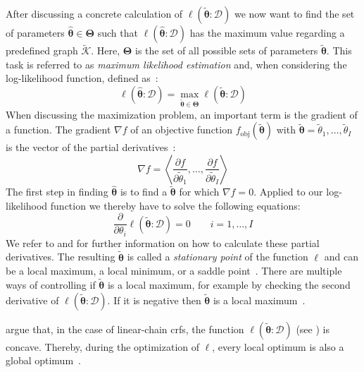 After discussing a concrete calculation of $\ell(\bm{\tilde{\theta}}:\mathcal{D})$ we now want to find the set of parameters $\bm{\hat{\theta}}\in\mathbf{\Theta}$ such that $\ell(\bm{\hat{\theta}}:\mathcal{D})$ has the maximum value regarding a predefined graph $\mathcal{\tilde{K}}$.
Here, $\bm{\Theta}$ is the set of all possible sets of parameters $\bm{\tilde{\theta}}$.
This task is referred to as \textit{maximum likelihood estimation} and, when considering the log-likelihood function, defined as~\citep{koller2009probabilistic}:
\begin{equation}
  \label{equ:maximum-log-likelihood-estimation}
  \ell\left(\bm{\hat{\theta}}:\mathcal{D}\right)=\max_{\bm{\tilde{\theta}}\in\mathbf{\Theta}}\ell\left(\bm{\tilde{\theta}}:\mathcal{D}\right)
\end{equation}
When discussing the maximization problem, an important term is the \gls{gradient} of a \gls{function}.
The \gls{gradient} $\nabla f$ of an objective function $f_{\text{obj}}(\bm{\tilde{\theta}})$ with $\bm{\tilde{\theta}}=\tilde{\theta}_1,\dots,\tilde{\theta}_I$ is the vector of the partial derivatives~\citep{koller2009probabilistic}:
\begin{equation}
  \label{equ:gradient}
  \nabla f=\left\langle\frac{\partial f}{\partial\tilde{\theta}_1},\dots,\frac{\partial f}{\partial\tilde{\theta}_I}\right\rangle
\end{equation}
The first step in finding $\bm{\hat{\theta}}$ is to find a $\bm{\tilde{\theta}}$ for which $\nabla f=0$.
Applied to our log-likelihood function we thereby have to solve the following equations:
\begin{equation}
  \label{equ:log-likelihood-gradient}
  \frac{\partial}{\partial\theta_i}\ell\left(\bm{\tilde{\theta}}:\mathcal{D}\right)=0\ \ \ \ \ \ \ \ \ i=1,\dots,I
\end{equation}
We refer to \citet{sutton2010introduction} and \citet{koller2009probabilistic} for further information on how to calculate these partial derivatives.
The resulting $\bm{\tilde{\theta}}$ is called a \textit{stationary point} of the function $\ell$ and can be a local maximum, a local minimum, or a saddle point~\citep{koller2009probabilistic}.
There are multiple ways of controlling if $\bm{\tilde{\theta}}$ is a local maximum, for example by checking the second derivative of $\ell(\bm{\tilde{\theta}}:\mathcal{D})$.
If it is negative then $\bm{\tilde{\theta}}$ is a local maximum~\citep{koller2009probabilistic}.

\citep{sutton2010introduction} argue that, in the case of \glspl{linear-chain crf}, the function $\ell(\bm{\tilde{\theta}}:\mathcal{D})$ (see ) is concave.
Thereby, during the optimization of $\ell$, every local optimum is also a global optimum~\citep{sutton2010introduction}.

